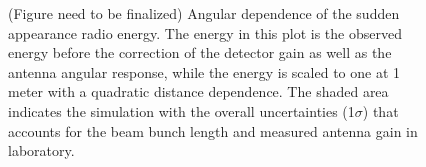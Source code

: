 \documentclass[12pt]{article}
\begin{document}
\begin{figure}[!h]
  \centering
  \hspace*{-3ex}
	\caption{ \color{red} (Figure need to be finalized) \color{black} 
	Angular dependence of the sudden appearance radio energy. 
	The energy in this plot is the observed energy before the correction of the detector
	gain as well as the antenna angular response, while the energy is scaled to one at 1 meter
	with a quadratic distance dependence. 
	The shaded area indicates the simulation with the overall uncertainties (1$\sigma$)
	that accounts for the beam bunch length and measured antenna gain in laboratory.
	}
  \label{fig:angdist}
\end{figure}
\end{document}
